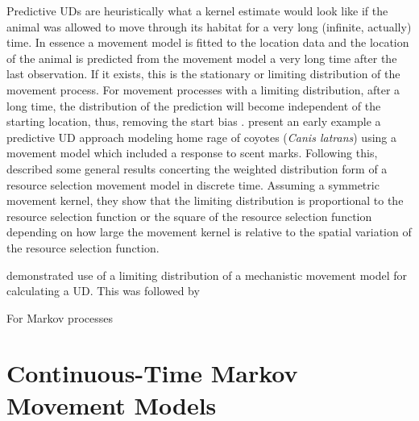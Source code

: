 \documentclass[12pt]{article}
\begin{document}
Predictive UDs are heuristically what a kernel estimate would look like if the animal was allowed to move through its habitat for a very long (infinite, actually) time. In essence a movement model is fitted to the location data and the location of the animal is predicted from the movement model a very long time after the last observation. If it exists, this is the stationary or limiting distribution of the movement process. For movement processes with a limiting distribution, after a long time, the distribution of the prediction will become independent of the starting location, thus, removing the start bias \citep{whitehead2013inferring}. \cite{moorcroft1999home} present an early example a predictive UD approach modeling home rage of coyotes ({\it Canis latrans}) using a movement model which included a response to scent marks. Following this, \cite{Barnett:2008wj} described some general results concerting the weighted distribution form \cite{Johnson:2008kx, Johnson:2013fk} of a resource selection movement model in discrete time. Assuming a symmetric movement kernel, they show that the limiting distribution is proportional to the resource selection function or the square of the resource selection function depending on how large the movement kernel is relative to the spatial variation of the resource selection function. 



demonstrated use of a limiting distribution of a mechanistic movement model for calculating a UD. This was followed by \cite{whitehead2013inferring}

For Markov processes


%
%
%
%
%
%
%
%
%
%
%


\section{Continuous-Time Markov Movement Models}
\end{document}
